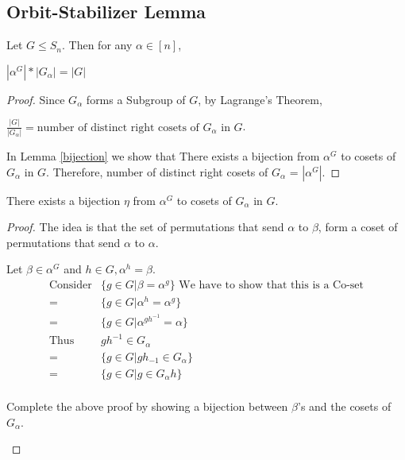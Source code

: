 \subsection{Orbit-Stabilizer Lemma}
\begin{theorem}
Let $G\leq S_n$. Then for any $\alpha \in [n]$,
\begin{center}
$|\alpha^G|*|G_{\alpha}| = |G|$ 
\end{center}
\end{theorem}
\begin{proof}
Since $G_{\alpha}$ forms a Subgroup of $G$, by Lagrange's Theorem,
\begin{center}
$\frac{|G|}{|G_{\alpha}|} = \mbox{number of distinct right cosets of $G_\alpha$ in $G$}$. 
\end{center}
In Lemma \ref{bijection} we show that There exists a bijection from $\alpha^G$ to cosets of $G_{\alpha}$ in $G$. Therefore, number of distinct right cosets of $G_{\alpha}$ = $|\alpha^G|$. 
\end{proof}


\begin{lemma}
\label{bijection}
There exists a bijection $\eta$ from $\alpha^G$ to cosets of $G_{\alpha}$ in $G$.
\end{lemma}
\begin{proof}
The idea is that the set of permutations that send $\alpha$ to $\beta$, form a coset of permutations that send $\alpha$ to $\alpha$.

Let $\beta \in \alpha^G$ and $h \in G,\alpha^h = \beta$.
\begin{align*}
\text{Consider} & \{g \in G| \beta = \alpha^g\}
\text{  We have to show that this is a Co-set}\\
 = & \{ g \in G | \alpha^h = \alpha^g \}\\
 = & \{ g \in G | \alpha^{gh^{-1}} = \alpha\}\\
\text{Thus } &  gh^{-1} \in G_{\alpha}\\
 = & \{ g \in G | gh_{-1} \in G_{\alpha} \}\\
 = & \{ g \in G | g \in G_{\alpha}h \}\\
\end{align*}
\begin{exercise}
Complete the above proof by showing a bijection between $\beta$'s and the cosets of $G_{\alpha}$.
\end{exercise}
\end{proof}





